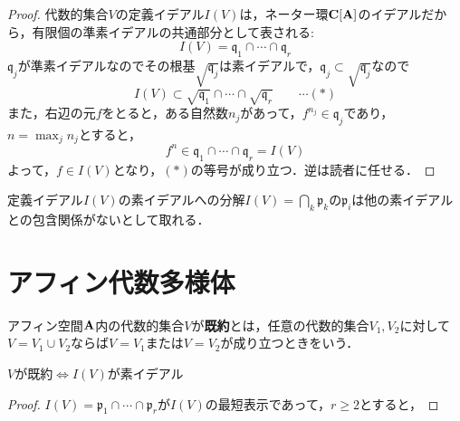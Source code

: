 \documentclass{myclass}
\begin{document}
\begin{proof}
  代数的集合$V$の定義イデアル$I(V)$は，ネーター環$\mathbf{C}[\mathbf{A}]$のイデアルだから，有限個の準素イデアルの共通部分として表される:
  \begin{equation*}
    I(V) = \mathfrak{q}_1\cap \cdots\cap \mathfrak{q}_r
  \end{equation*}
  $\mathfrak{q}_j$が準素イデアルなのでその根基$\sqrt{\mathfrak{q}_j}$は素イデアルで，$\mathfrak{q}_j\subset \sqrt{\mathfrak{q}_j}$なので
  \begin{equation*}
    I(V) \subset \sqrt{\mathfrak{q}_1}\cap \cdots \cap \sqrt{\mathfrak{q}_r}\qquad \cdots (*)
  \end{equation*}
  また，右辺の元$f$をとると，ある自然数$n_j$があって，$f^{n_j} \in \mathfrak{q}_j$であり，$n = \max_j n_j$とすると，
  \begin{equation*}
    f^n \in \mathfrak{q}_1\cap \cdots \cap \mathfrak{q}_r = I(V)
  \end{equation*}
  よって，$f\in I(V)$となり，$(*)$の等号が成り立つ．逆は読者に任せる．
\end{proof}

\begin{remark}
  定義イデアル$I(V)$の素イデアルへの分解$I(V) = \bigcap_k \mathfrak{p}_k$の$\mathfrak{p}_i$は他の素イデアルとの包含関係がないとして取れる． 
\end{remark}


\section{アフィン代数多様体}

\begin{definition}
  アフィン空間$\mathbf{A}$内の代数的集合$V$が\textbf{既約}とは，任意の代数的集合$V_1,V_2$に対して$V = V_1\cup V_2$ならば$V=V_1$または$V=V_2$が成り立つときをいう．
\end{definition}

\begin{proposition}
  $V$が既約$\Leftrightarrow$$I(V)$が素イデアル
\end{proposition}
\begin{proof}
  $I(V) = \mathfrak{p}_1\cap \cdots \cap \mathfrak{p}_r$が$I(V)$の最短表示であって，$r\geq 2$とすると，
\end{proof}



\backmatter

\printindex



\end{document}
